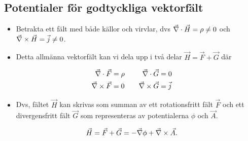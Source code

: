 \documentclass[%
oneside,                 %
final,                   %
10pt]{article}
\begin{document}
\subsection*{Potentialer för godtyckliga vektorfält}

\begin{itemize}
\item Betrakta ett fält med både källor och virvlar, dvs $\vec{\nabla} \cdot \vec{H} = \rho \neq 0$ och $\vec{\nabla} \times \vec{H} = \vec{j} \neq 0$.

\item Detta allmänna vektorfält kan vi dela upp i två delar $\vec{H} = \vec{F} + \vec{G}$ där
\end{itemize}

\noindent
\begin{align}
\vec{\nabla} \cdot \vec{F} &= \rho \quad  &\vec{\nabla} \cdot \vec{G} &= 0 \\
\vec{\nabla} \times \vec{F} &= 0 \quad  &\vec{\nabla} \times \vec{G} &= \vec{j}
\end{align}

\begin{itemize}
\item Dvs, fältet $\vec{H}$ kan skrivas som summan av ett rotationsfritt fält $\vec{F}$ och ett divergensfritt fält $\vec{G}$ som representeras av potentialerna $\phi$ och $\vec{A}$.
\end{itemize}

\noindent
$$
\vec{H} = \vec{F} + \vec{G} = -\vec{\nabla} \phi + \vec{\nabla} \times \vec{A}.
$$
\end{document}
